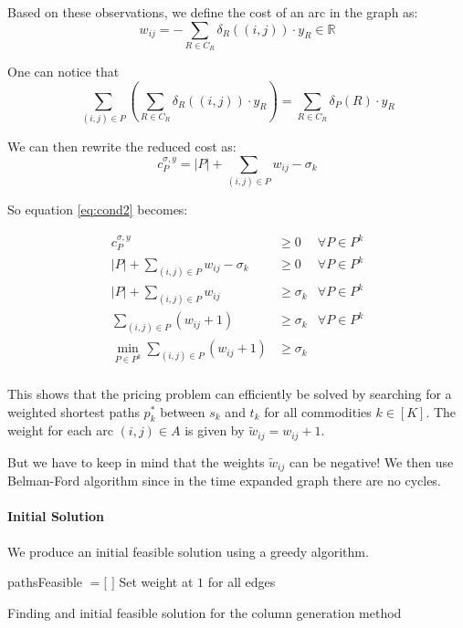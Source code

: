 \documentclass[14pt,a4paper]{article}
\theoremstyle{definition}
\numberwithin{equation}{subsection}
\begin{document}
Based on these observations, we define the cost of an arc in the graph as:
\begin{equation*}
w_{ij} = -\sum_{R \in C_R} \delta_R((i,j))\cdot y_R \in \mathbb{R}
\end{equation*}

One can notice that 
$$ \sum_{(i,j)\in P}\left(\sum_{R \in C_R} \delta_R((i,j))\cdot y_R \right)=   \sum\limits_{R \in C_R}    \delta_P(R)\cdot y_R$$

We can then rewrite the reduced cost as: 
$$ c_P^{\sigma,y} = |P| + \sum\limits_{(i,j) \in P}  w_{ij} -\sigma_k $$

So equation \eqref{eq:cond2} becomes:

\begin{eqnarray*}
		c_P^{\sigma,y} & \geq 0 &\forall P \in P^k\\
		|P| + \sum\limits_{(i,j) \in P}  w_{ij} -\sigma_k & \geq 0 &\forall P \in P^k\\
		|P| + \sum\limits_{(i,j) \in P}  w_{ij}  & \geq \sigma_k &\forall P \in P^k\\
		\sum\limits_{(i,j) \in P} \left( w_{ij} + 1\right)  & \geq \sigma_k &\forall P \in P^k\\
		\min_{P\in P^k}\sum\limits_{(i,j) \in P} \left( w_{ij} + 1\right)  & \geq \sigma_k & \\
\end{eqnarray*}


This shows that the pricing problem can efficiently be solved by searching for a weighted shortest paths $p^*_k$ between $s_k$ and $t_k$ for all commodities $k \in [K]$. The weight for each arc $(i,j)\in A$ is given by $\tilde{w}_{ij} = w_{ij}+1$.


But we have to keep in mind that the weights $\tilde{w}_{ij}$ can be negative! We then use Belman-Ford algorithm since in the time expanded graph there are no cycles.



\paragraph{Initial Solution}
We produce an initial feasible solution using a greedy algorithm.\\


\begin{algorithm}[H]
	\SetAlgoLined
	pathsFeasible $= [$  $]$\;
	Set weight at $1$ for all edges\;
	
	
	\caption{Finding and initial feasible solution for the column generation method}
\end{algorithm}
\end{document}
